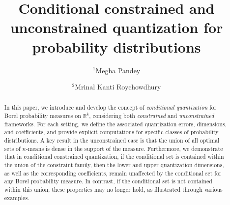 \documentclass[12pt, reqno]{amsart}
\theoremstyle{plain}
\theoremstyle{definition}
\begin{document}
\title{Conditional constrained and unconstrained quantization for probability distributions}

\author{$^1$Megha Pandey}
 \author{$^2$Mrinal Kanti Roychowdhury}





\address{$^{1}$Department of Mathematical Sciences \\
Indian Institute of Technology (Banaras Hindu University)\\
Varanasi, 221005, India.}
\address{$^{2}$School of Mathematical and Statistical Sciences\\
University of Texas Rio Grande Valley\\
1201 West University Drive\\
Edinburg, TX 78539-2999, USA.}

 





\date{}
\maketitle
%
\pagestyle{myheadings}
\begin{abstract}
In this paper, we introduce and develop the concept of \emph{conditional quantization} for Borel probability measures on \( \mathbb{R}^k \), considering both \emph{constrained} and \emph{unconstrained} frameworks. For each setting, we define the associated quantization errors, dimensions, and coefficients, and provide explicit computations for specific classes of probability distributions. A key result in the unconstrained case is that the union of all optimal sets of \( n \)-means is dense in the support of the measure. Furthermore, we demonstrate that in conditional constrained quantization, if the conditional set is contained within the union of the constraint family, then the lower and upper quantization dimensions, as well as the corresponding coefficients, remain unaffected by the conditional set for any Borel probability measure. In contrast, if the conditional set is not contained within this union, these properties may no longer hold, as illustrated through various examples.
\end{abstract}
\end{document}
